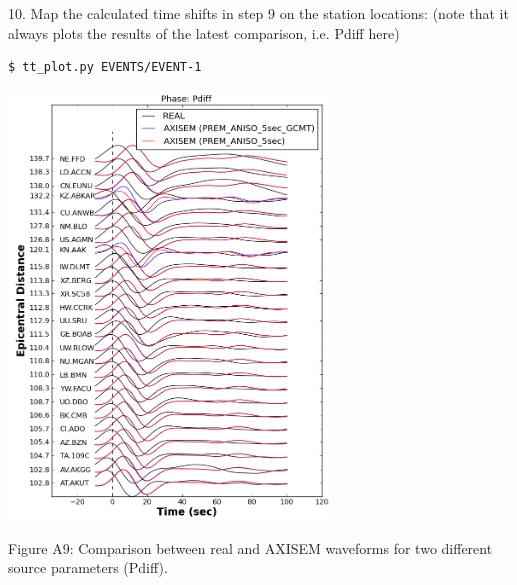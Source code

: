 \documentclass{article}
\begin{document}
\vspace{13pt}
10. Map the calculated time shifts in step 9 on the station locations: (note that 
it always plots the results of the latest comparison, i.e. Pdiff here) 

\begin{lstlisting}
$ tt_plot.py EVENTS/EVENT-1
\end{lstlisting}

\begin{center}
\includegraphics[width=242pt, height=322pt, keepaspectratio=true]{AXISEMTutorial-fig015.png}

{\small{}Figure A9: Comparison between real and AXISEM waveforms for two different 
source parameters (Pdiff).}


\end{center}
\end{document}
